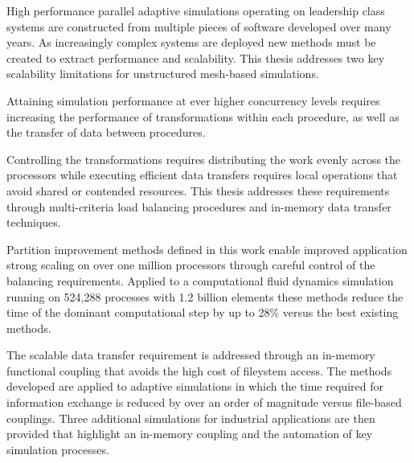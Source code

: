 High performance parallel adaptive simulations operating on leadership class
systems are constructed from multiple pieces of software developed over many
years.
As increasingly complex systems are deployed new methods must be created to
extract performance and scalability.
This thesis addresses two key scalability limitations for unstructured
mesh-based simulations.

Attaining simulation performance at ever higher concurrency levels requires
increasing the performance of transformations within each procedure, as well as the
transfer of data between procedures.

Controlling the transformations requires distributing the work evenly across the
processors while executing efficient data transfers requires local operations
that avoid shared or contended resources.
This thesis addresses these requirements through multi-criteria load balancing
procedures and in-memory data transfer techniques.

Partition improvement methods defined in this work enable improved application
strong scaling on over one million processors through careful control of the
balancing requirements.
Applied to a computational fluid dynamics simulation running on 524,288
processes with 1.2 billion elements these methods reduce the time of the
dominant computational step by up to 28\% versus the best existing methods.

The scalable data transfer requirement is addressed through an
in-memory functional coupling that avoids the high cost of fileystem access.
The methods developed are applied to adaptive simulations in which
the time required for information exchange is reduced by over an
order of magnitude versus file-based couplings.
Three additional simulations for industrial applications are then provided that
highlight an in-memory coupling and the automation of key simulation processes.
